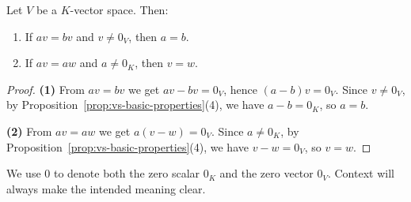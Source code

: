 \begin{proposition}\label{prop:cancellation}
    Let $V$ be a $K$-vector space. Then:
    \begin{enumerate}
        \item If $av = bv$ and $v \neq 0_V$, then $a = b$.
        \item If $av = aw$ and $a \neq 0_K$, then $v = w$.
    \end{enumerate}
\end{proposition}

\begin{proof}
    \textbf{(1)} From $av = bv$ we get $av - bv = 0_V$, hence $(a - b)v = 0_V$.
    Since $v \neq 0_V$, by Proposition~\ref{prop:vs-basic-properties}(4), we have $a - b = 0_K$,
    so $a = b$.

    \textbf{(2)} From $av = aw$ we get $a(v - w) = 0_V$.
    Since $a \neq 0_K$, by Proposition~\ref{prop:vs-basic-properties}(4), we have $v - w = 0_V$,
    so $v = w$.
\end{proof}

\begin{remark}
    We use $0$ to denote both the zero scalar $0_K$ and the zero vector $0_V$.
    Context will always make the intended meaning clear.
\end{remark}
